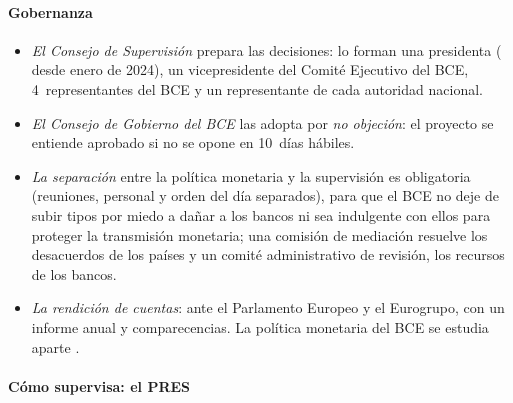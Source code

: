 \documentclass[11pt]{article}
\begin{document}
\paragraph{Gobernanza}

\begin{itemize}
\item \emph{El Consejo de Supervisión} prepara las decisiones: lo forman una presidenta ( desde enero de 2024), un vicepresidente del Comité Ejecutivo del BCE, 4~representantes del BCE y un representante de cada autoridad nacional.
\item \emph{El Consejo de Gobierno del BCE} las adopta por \emph{no objeción}: el proyecto se entiende aprobado si no se opone en 10~días hábiles.
\item \emph{La separación} entre la política monetaria y la supervisión es obligatoria (reuniones, personal y orden del día separados), para que el BCE no deje de subir tipos por miedo a dañar a los bancos ni sea indulgente con ellos para proteger la transmisión monetaria; una comisión de mediación resuelve los desacuerdos de los países y un comité administrativo de revisión, los recursos de los bancos.
\item \emph{La rendición de cuentas}: ante el Parlamento Europeo y el Eurogrupo, con un informe anual y comparecencias. La política monetaria del BCE se estudia aparte .
\end{itemize}

\paragraph{Cómo supervisa: el PRES}
\end{document}
